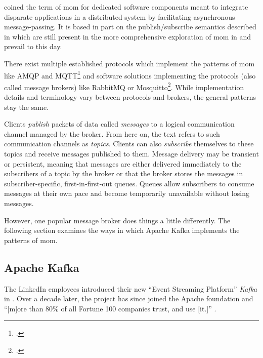 \cite{banavar_case_1999} coined the term of \acrlong{mom} for dedicated software components meant to integrate disparate applications in a distributed system by facilitating asynchronous message-passing.
It is based in part on the publish/subscribe semantics described in \cite{oki_information_1993} which are still present in the more comprehensive exploration of \gls{mom} in \cite{curry_message-oriented_2004} and prevail to this day.

There exist multiple established protocols which implement the patterns of \gls{mom} like AMQP and MQTT\footcites{amqp}{mqtt} and software solutions implementing the protocols (also called message brokers) like RabbitMQ or Mosquitto\footcites{rabbitmq}{mosquitto}.
While implementation details and terminology vary between protocols and brokers, the general patterns stay the same.

Clients \emph{publish} packets of data called \emph{messages} to a logical communication channel managed by the broker.
From here on, the text refers to such communication channels as \emph{topics}.
Clients can also \emph{subscribe} themselves to these topics and receive messages published to them.
Message delivery may be transient or persistent, meaning that messages are either delivered immediately to the subscribers of a topic by the broker or that the broker stores the messages in subscriber-specific, first-in-first-out queues.
Queues allow subscribers to consume messages at their own pace and become temporarily unavailable without losing messages.
\parencite{curry_message-oriented_2004}

However, one popular message broker does things a little differently.
The following section examines the ways in which Apache Kafka implements the patterns of \gls{mom}.

\subsection{Apache Kafka}

The LinkedIn employees \citeauthor{kreps_kafka_2011} introduced their new \enquote{Event Streaming Platform} \emph{Kafka} in \citeyear{kreps_kafka_2011} \parencite{kreps_kafka_2011}.
Over a decade later, the project has since joined the Apache foundation and \enquote{[m]ore than 80\% of all Fortune 100 companies trust, and use [it.]} \parencite{apache_software_foundation_apache_nodate}.

